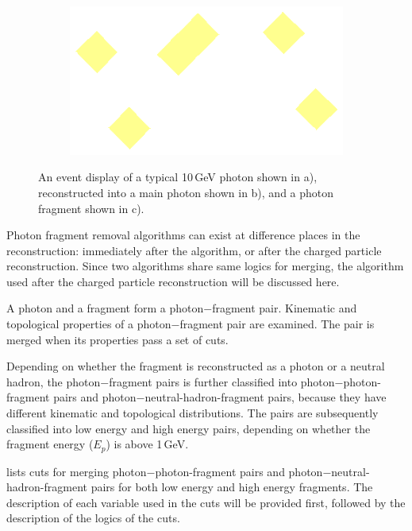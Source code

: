 \begin{figure}[tbph]
\begin{subfigure}[b]{0.3\textwidth}
    \caption{}
    \label{fig:photonEvtDspPhotonFragBig}
  \end{subfigure}
  \begin{subfigure}[b]{0.3\textwidth}
    \includegraphics[width=\textwidth]{photon/small}
    \caption{}
    \label{fig:photonEvtDspPhotonFragSmall}
  \end{subfigure}

\caption
{An event display of a typical 10\,GeV photon shown in a), reconstructed into a main photon shown in b), and a photon fragment shown in c). }
\label{fig:photonEvtDspPhotonFrag}
\end{figure}


Photon fragment removal algorithms can exist at difference places in the reconstruction: immediately after the \PhotonReconstruction algorithm, or after the charged particle reconstruction. Since two algorithms share same logics for merging, the algorithm used   after the charged particle reconstruction will be discussed here.

A photon and a fragment form a photon$-$fragment pair. Kinematic and topological properties of a photon$-$fragment pair are examined. The pair is merged when its properties pass a set of cuts.

Depending on whether the fragment is reconstructed as a photon or a neutral hadron, the photon$-$fragment pairs is further classified into photon$-$photon-fragment pairs and photon$-$neutral-hadron-fragment pairs, because they have different kinematic and topological distributions. The pairs are subsequently  classified into low energy and high energy pairs, depending on whether the fragment energy ($E_p$) is above 1\,GeV.


 lists cuts for merging photon$-$photon-fragment pairs and photon$-$neutral-hadron-fragment pairs for both low energy and high energy fragments. The description of each variable used in the cuts will be provided first, followed by the description of the logics of the cuts.

